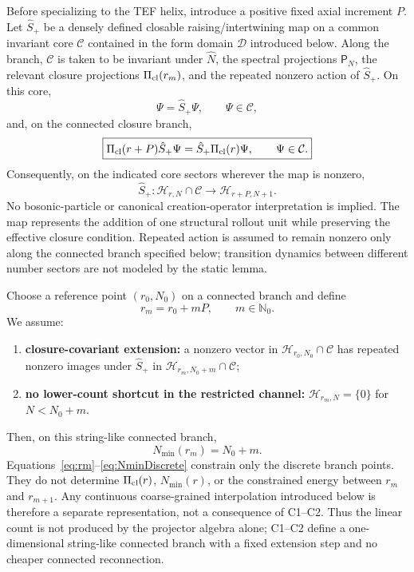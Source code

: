 \documentclass[10pt]{article}
\begin{document}
Before specializing to the TEF helix, introduce a positive fixed axial increment $P$. Let $\hat S_+$ be a densely defined closable raising/intertwining map on a common invariant core $\mathcal C$ contained in the form domain $\mathcal D$ introduced below. Along the branch, $\mathcal C$ is taken to be invariant under $\hat N$, the spectral projections $\mathsf P_N$, the relevant closure projections $\Pi_{\rm cl}(r_m)$, and the repeated nonzero action of $\hat S_+$. On this core,
\begin{equation}
[\hat N,\hat S_+]\Psi=\hat S_+\Psi,
\qquad \Psi\in\mathcal C,
\label{eq:rolloutalgebra}
\end{equation}
and, on the connected closure branch,
\begin{equation}
\boxed{
\Pi_{\rm cl}(r+P)\hat S_+\Psi
=\hat S_+\Pi_{\rm cl}(r)\Psi,
\qquad \Psi\in\mathcal C.
}
\label{eq:intertwine}
\end{equation}
Consequently, on the indicated core sectors wherever the map is nonzero,
\begin{equation}
\hat S_+:\mathcal H_{r,N}\cap\mathcal C
\longrightarrow\mathcal H_{r+P,N+1}.
\label{eq:Umap}
\end{equation}
No bosonic-particle or canonical creation-operator interpretation is implied. The map represents the addition of one structural rollout unit while preserving the effective closure condition. Repeated action is assumed to remain nonzero only along the connected branch specified below; transition dynamics between different number sectors are not modeled by the static lemma.

Choose a reference point $(r_0,N_0)$ on a connected branch and define
\begin{equation}
r_m=r_0+mP,\qquad m\in\mathbb N_0.
\label{eq:rm}
\end{equation}
We assume:
\begin{enumerate}[label=(C\arabic*)]
\item \textbf{closure-covariant extension:} a nonzero vector in $\mathcal H_{r_0,N_0}\cap\mathcal C$ has repeated nonzero images under $\hat S_+$ in $\mathcal H_{r_m,N_0+m}\cap\mathcal C$;
\item \textbf{no lower-count shortcut in the restricted channel:} $\mathcal H_{r_m,N}=\{0\}$ for $N<N_0+m$.
\end{enumerate}
Then, on this string-like connected branch,
\begin{equation}
\boxed{N_{\min}(r_m)=N_0+m.}
\label{eq:NminDiscrete}
\end{equation}
Equations~\eqref{eq:rm}--\eqref{eq:NminDiscrete} constrain only the discrete branch points. They do not determine $\Pi_{\rm cl}(r)$, $N_{\min}(r)$, or the constrained energy between $r_m$ and $r_{m+1}$. Any continuous coarse-grained interpolation introduced below is therefore a separate representation, not a consequence of C1--C2. Thus the linear count is not produced by the projector algebra alone; C1--C2 define a one-dimensional string-like connected branch with a fixed extension step and no cheaper connected reconnection.
\end{document}
